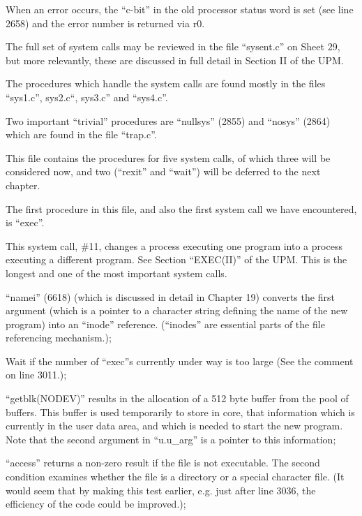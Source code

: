 \item[2776:] When an error occurs, the ``c-bit''
in the old processor status word
is set (see line 2658) and the
error number is returned via r0.
\ed


The full set of system calls may be
reviewed in the file ``sysent.c'' on
Sheet 29, but more relevantly, these
are discussed in full detail in Section
II of the UPM.

The procedures which handle the system
calls are found mostly in the files
``sys1.c'', sys2.c``, sys3.c'' and
``sys4.c''.

Two important ``trivial'' procedures are
``nullsys'' (2855) and ``nosys'' (2864)
which are found in the file ``trap.c''.



This file contains the procedures for
five system calls, of which three will
be considered now, and two (``rexit'' and
``wait'') will be deferred to the next
chapter.

The first procedure in this file, and 
also the first system call we have
encountered, is ``exec''.


This system call, \#11, changes a process executing
one program into a process executing a different program.
See Section ``EXEC(II)'' of the UPM.
This is the longest and one of the most
important system calls.

\bd
\item[3034:] ``namei'' (6618) (which is discussed in detail in Chapter 19)
converts the first argument
(which is a pointer to a character
 string defining the name of 
 the new program) into an ``inode''
 reference. (``inodes'' are essential parts of the file
 referencing mechanism.);

\item[3037:] Wait if the number of ``exec''s
 currently under way is too large
 (See the comment on line 3011.);

\item[3040:] ``getblk(NODEV)'' results in the
 allocation of a 512 byte buffer
 from the pool of buffers. This
 buffer is used temporarily to
 store in core, that information
 which is currently in the user
 data area, and which is needed to
 start the new program. Note that
 the second argument in ``u.u\_arg''
 is a pointer to this information;

\item[3041:] ``access'' returns a non-zero
result if the file is not executable. The second
condition examines whether the file is a
directory or a special character file.
(It would seem that by making
this test earlier, e.g. just
after line 3036, the efficiency
of the code could be improved.);

